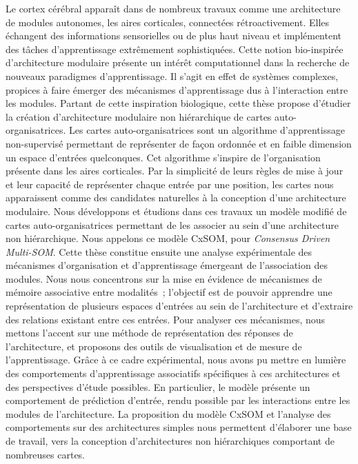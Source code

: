 \documentclass[11pt]{thesul-cs}
\begin{document}
\dominitoc


\begin{ThesisAbstract}
  \begin{FrenchAbstract}
Le cortex cérébral apparaît dans de nombreux travaux comme une architecture de modules autonomes, les aires corticales, connectées rétroactivement. Elles échangent des informations sensorielles ou de plus haut niveau et implémentent des tâches d'apprentissage extrêmement sophistiquées. Cette notion bio-inspirée d'architecture modulaire présente un intérêt computationnel dans la recherche de nouveaux paradigmes d'apprentissage. Il s'agit en effet de systèmes complexes, propices à faire émerger des mécanismes d'apprentissage dus à l'interaction entre les modules.
Partant de cette inspiration biologique, cette thèse propose d'étudier la création d'architecture modulaire non hiérarchique de cartes auto-organisatrices.
Les cartes auto-organisatrices sont un algorithme d'apprentissage non-supervisé permettant de représenter de façon ordonnée et en faible dimension un espace d'entrées quelconques. Cet algorithme s'inspire de l'organisation présente dans les aires corticales. 
Par la simplicité de leurs règles de mise à jour et leur capacité de représenter chaque entrée par une position, les cartes nous apparaissent comme des candidates naturelles à la conception d'une architecture modulaire.
Nous développons et étudions dans ces travaux un modèle modifié de cartes auto-organisatrices permettant de les associer au sein d'une architecture non hiérarchique. Nous appelons ce modèle CxSOM, pour \emph{Consensus Driven Multi-SOM}.
Cette thèse constitue ensuite une analyse expérimentale des mécanismes d'organisation et d'apprentissage émergeant de l'association des modules. Nous nous concentrons sur la mise en évidence de mécanismes de mémoire associative entre modalités~; l'objectif est de pouvoir apprendre une représentation de plusieurs espaces d'entrées au sein de l'architecture et d'extraire des relations existant entre ces entrées.
Pour analyser ces mécanismes, nous mettons l'accent sur une méthode de représentation des réponses de l'architecture, et proposons des outils de visualisation et de mesure de l'apprentissage. Grâce à ce cadre expérimental, nous avons pu mettre en lumière des comportements d'apprentissage associatifs spécifiques à ces architectures et des perspectives d'étude possibles.
En particulier, le modèle présente un comportement de prédiction d'entrée, rendu possible par les interactions entre les modules de l'architecture.
La proposition du modèle CxSOM et l'analyse des comportements sur des architectures simples nous permettent d'élaborer une base de travail, vers la conception d'architectures non hiérarchiques comportant de nombreuses cartes.


\end{FrenchAbstract}
\end{ThesisAbstract}
\end{document}

